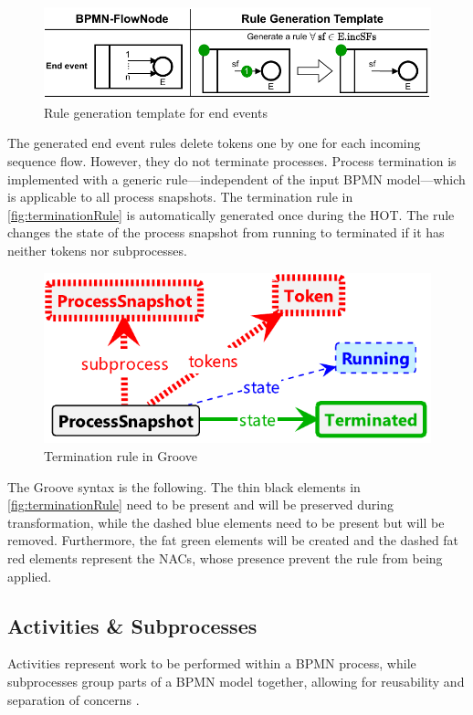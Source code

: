 \documentclass{lmcs} %
\begin{document}
\begin{figure}[ht]
    \centering
    \includegraphics[width=.8\textwidth]{images/end_template.pdf}
    \caption{Rule generation template for end events}
    \label{fig:endTemplate}
\end{figure}
    
The generated end event rules delete tokens one by one for each incoming sequence flow.
However, they do not terminate processes.
Process termination is implemented with a generic rule---independent of the input BPMN model---which is applicable to all process snapshots.
The termination rule in \autoref{fig:terminationRule} is automatically generated once during the HOT.
The rule changes the state of the process snapshot from running to terminated if it has neither tokens nor subprocesses.

\begin{figure}[ht]
    \centering
    \includegraphics[width=.6\textwidth]{images/Terminate.pdf}
    \caption{Termination rule in Groove}
    \label{fig:terminationRule}
\end{figure}

The Groove syntax is the following.
The thin black elements in \autoref{fig:terminationRule} need to be present and will be preserved during transformation, while the dashed blue elements need to be present but will be removed.
Furthermore, the fat green elements will be created and the dashed fat red elements represent the NACs, whose presence prevent the rule from being applied.

\subsection{Activities \& Subprocesses}
Activities represent work to be performed within a BPMN process, while subprocesses group parts of a BPMN model together, allowing for reusability and separation of concerns \cite{objectmanagementgroupBusinessProcessModel2013}.
\end{document}
